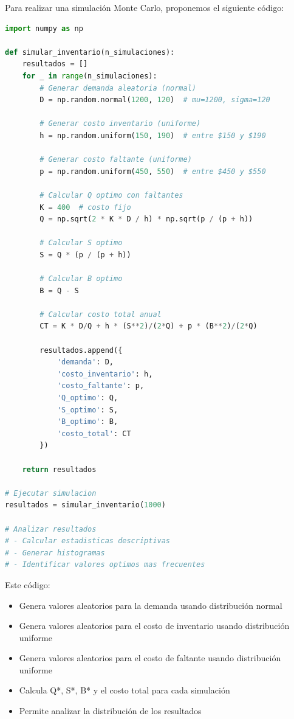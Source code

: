 \documentclass[12pt]{article}
\begin{document}
Para realizar una simulación Monte Carlo, proponemos el siguiente código:

\begin{lstlisting}[language=Python]
import numpy as np

def simular_inventario(n_simulaciones):
    resultados = []
    for _ in range(n_simulaciones):
        # Generar demanda aleatoria (normal)
        D = np.random.normal(1200, 120)  # mu=1200, sigma=120
        
        # Generar costo inventario (uniforme)
        h = np.random.uniform(150, 190)  # entre $150 y $190
        
        # Generar costo faltante (uniforme)
        p = np.random.uniform(450, 550)  # entre $450 y $550
        
        # Calcular Q optimo con faltantes
        K = 400  # costo fijo
        Q = np.sqrt(2 * K * D / h) * np.sqrt(p / (p + h))
        
        # Calcular S optimo
        S = Q * (p / (p + h))
        
        # Calcular B optimo
        B = Q - S
        
        # Calcular costo total anual
        CT = K * D/Q + h * (S**2)/(2*Q) + p * (B**2)/(2*Q)
        
        resultados.append({
            'demanda': D,
            'costo_inventario': h,
            'costo_faltante': p,
            'Q_optimo': Q,
            'S_optimo': S,
            'B_optimo': B,
            'costo_total': CT
        })
    
    return resultados

# Ejecutar simulacion
resultados = simular_inventario(1000)

# Analizar resultados
# - Calcular estadisticas descriptivas
# - Generar histogramas
# - Identificar valores optimos mas frecuentes
\end{lstlisting}

Este código:
\begin{itemize}
    \item Genera valores aleatorios para la demanda usando distribución normal
    \item Genera valores aleatorios para el costo de inventario usando distribución uniforme
    \item Genera valores aleatorios para el costo de faltante usando distribución uniforme
    \item Calcula Q*, S*, B* y el costo total para cada simulación
    \item Permite analizar la distribución de los resultados
\end{itemize}
\end{document}
